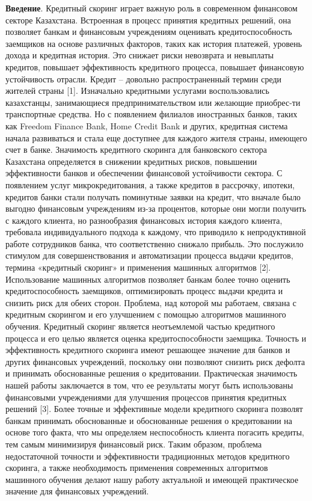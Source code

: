 \begin{multicols}{2}

{\bfseries Введение}. Кредитный скоринг играет важную роль в современном
финансовом секторе Казахстана. Встроенная в процесс принятия кредитных
решений, она позволяет банкам и финансовым учреждениям оценивать
кредитоспособность заемщиков на основе различных факторов, таких как
история платежей, уровень дохода и кредитная история. Это снижает риски
невозврата и невыплаты кредитов, повышает эффективность кредитного
процесса, повышает финансовую устойчивость отрасли. Кредит -- довольно
распространенный термин среди жителей страны {[}1{]}. Изначально
кредитными услугами воспользовались казахстанцы, занимающиеся
предпринимательством или желающие приобрес-ти транспортные средства. Но с
появлением филиалов иностранных банков, таких как Freedom Finance Bank,
Home Credit Bank и других, кредитная система начала развиваться и стала
еще доступнее для каждого жителя страны, имеющего счет в банке.
Значимость кредитного скоринга для банковского сектора Казахстана
определяется в снижении кредитных рисков, повышении эффективности банков
и обеспечении финансовой устойчивости сектора. С появлением услуг
микрокредитования, а также кредитов в рассрочку, ипотеки, кредитов банки
стали получать поминутные заявки на кредит, что вначале было выгодно
финансовым учреждениям из-за процентов, которые они могли получить с
каждого клиента, но разнообразия финансовых история каждого клиента,
требовала индивидуального подхода к каждому, что приводило к
непродуктивной работе сотрудников банка, что соответственно снижало
прибыль. Это послужило стимулом для совершенствования и автоматизации
процесса выдачи кредитов, термина «кредитный скоринг» и применения
машинных алгоритмов {[}2{]}. Использование машинных алгоритмов позволяет
банкам более точно оценить кредитоспособность заемщиков, оптимизировать
процесс выдачи кредита и снизить риск для обеих сторон. Проблема, над
которой мы работаем, связана с кредитным скорингом и его улучшением с
помощью алгоритмов машинного обучения. Кредитный скоринг является
неотъемлемой частью кредитного процесса и его целью является оценка
кредитоспособности заемщика. Точность и эффективность кредитного
скоринга имеют решающее значение для банков и других финансовых
учреждений, поскольку они позволяют снизить риск дефолта и принимать
обоснованные решения о кредитовании. Практическая значимость нашей
работы заключается в том, что ее результаты могут быть использованы
финансовыми учреждениями для улучшения процессов принятия кредитных
решений {[}3{]}. Более точные и эффективные модели кредитного скоринга
позволят банкам принимать обоснованные и обоснованные решения о
кредитовании на основе того факта, что мы определяем неспособность
клиента погасить кредиты, тем самым минимизируя финансовый риск. Таким
образом, проблема недостаточной точности и эффективности традиционных
методов кредитного скоринга, а также необходимость применения
современных алгоритмов машинного обучения делают нашу работу актуальной
и имеющей практическое значение для финансовых учреждений.


\end{multicols}
